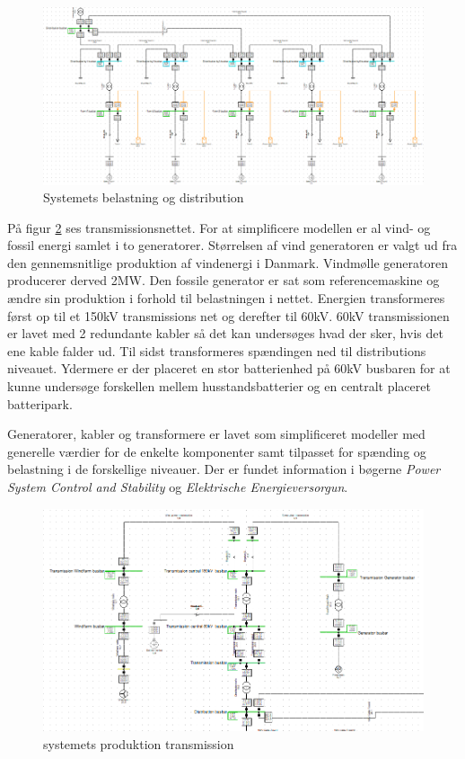  
 \begin{figure}[H] %
 	\centering
 	\includegraphics[width=1\textwidth]{figurer/Sim_model_2}
 	\caption{Systemets belastning og distribution}
 	\label{fig:Simdis}
 \end{figure}
    

På figur \ref{fig:SimTrans} ses transmissionsnettet. For at simplificere modellen er al vind- og fossil energi samlet i to generatorer. Størrelsen af vind generatoren er valgt ud fra den gennemsnitlige produktion af vindenergi i Danmark. Vindmølle generatoren producerer derved 2MW. Den fossile generator er sat som referencemaskine og ændre sin produktion i forhold til belastningen i nettet. Energien transformeres først op til et 150kV transmissions net og derefter til 60kV. 60kV transmissionen er lavet med 2 redundante kabler så det kan undersøges hvad der sker, hvis det ene kable falder ud. Til sidst transformeres spændingen ned til distributions niveauet. Ydermere er der placeret en stor batterienhed på 60kV busbaren for at kunne undersøge forskellen mellem husstandsbatterier og en centralt placeret batteripark.

Generatorer, kabler og transformere er lavet som simplificeret modeller med generelle værdier for de enkelte komponenter samt tilpasset for spænding og belastning i de forskellige niveauer. Der er fundet information i bøgerne \textit{Power System Control and Stability} og \textit{Elektrische Energieversorgun}.

 

\begin{figure}[H] %
	\centering
	\includegraphics[width=1\textwidth]{figurer/Sim_model_1}
	\caption{systemets produktion transmission}
	\label{fig:SimTrans}
\end{figure}
